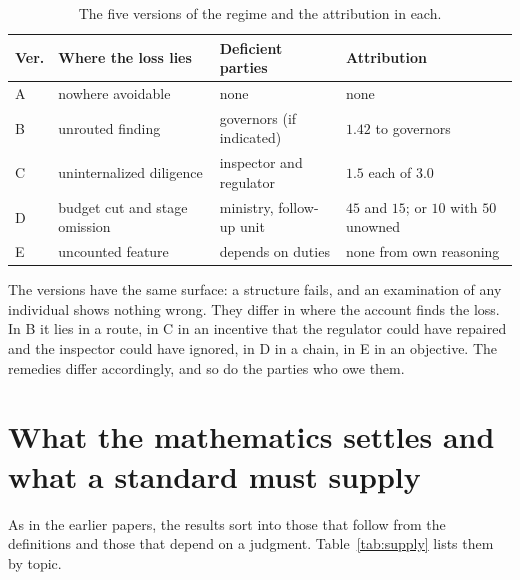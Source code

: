 \documentclass[11pt]{article}
\theoremstyle{plain}
\theoremstyle{definition}
\begin{document}
\begin{table}[h]
\centering
\small
\begin{tabular}{@{}>{\raggedright\arraybackslash}p{0.9cm}>{\raggedright\arraybackslash}p{3.6cm}>{\raggedright\arraybackslash}p{3.4cm}>{\raggedright\arraybackslash}p{3.6cm}@{}}
\hline
Ver. & Where the loss lies & Deficient parties & Attribution \\
\hline
A & nowhere avoidable & none & none \\
B & unrouted finding & governors (if indicated) & $1.42$ to governors \\
C & uninternalized diligence & inspector and regulator & $1.5$ each of $3.0$ \\
D & budget cut and stage omission & ministry, follow-up unit & $45$ and $15$; or $10$ with $50$ unowned \\
E & uncounted feature & depends on duties & none from own reasoning \\
\hline
\end{tabular}
\caption{The five versions of the regime and the attribution in each.}
\label{tab:versions}
\end{table}

The versions have the same surface: a structure fails, and an examination of any individual shows nothing wrong. They differ in where the account finds the loss. In B it lies in a route, in C in an incentive that the regulator could have repaired and the inspector could have ignored, in D in a chain, in E in an objective. The remedies differ accordingly, and so do the parties who owe them.

\section{What the mathematics settles and what a standard must supply}\label{sec:supply}

As in the earlier papers, the results sort into those that follow from the definitions and those that depend on a judgment. Table~\ref{tab:supply} lists them by topic.
\end{document}
